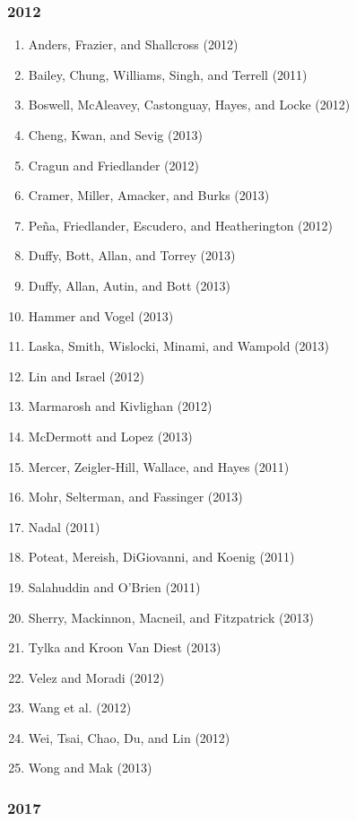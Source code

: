 \documentclass[english,man]{apa6}
\providecommand{\tightlist}{%
  \setlength{\itemsep}{0pt}\setlength{\parskip}{0pt}}
\begin{document}
\subsubsection{2012}\label{section-8}

\begin{enumerate}
\def\labelenumi{\arabic{enumi})}
\tightlist
\item
  Anders, Frazier, and Shallcross (2012)
\item
  Bailey, Chung, Williams, Singh, and Terrell (2011)
\item
  Boswell, McAleavey, Castonguay, Hayes, and Locke (2012)
\item
  Cheng, Kwan, and Sevig (2013)
\item
  Cragun and Friedlander (2012)
\item
  Cramer, Miller, Amacker, and Burks (2013)
\item
  Peña, Friedlander, Escudero, and Heatherington (2012)
\item
  Duffy, Bott, Allan, and Torrey (2013)
\item
  Duffy, Allan, Autin, and Bott (2013)
\item
  Hammer and Vogel (2013)
\item
  Laska, Smith, Wislocki, Minami, and Wampold (2013)
\item
  Lin and Israel (2012)
\item
  Marmarosh and Kivlighan (2012)
\item
  McDermott and Lopez (2013)
\item
  Mercer, Zeigler-Hill, Wallace, and Hayes (2011)
\item
  Mohr, Selterman, and Fassinger (2013)
\item
  Nadal (2011)
\item
  Poteat, Mereish, DiGiovanni, and Koenig (2011)
\item
  Salahuddin and O'Brien (2011)
\item
  Sherry, Mackinnon, Macneil, and Fitzpatrick (2013)
\item
  Tylka and Kroon Van Diest (2013)
\item
  Velez and Moradi (2012)
\item
  Wang et al. (2012)
\item
  Wei, Tsai, Chao, Du, and Lin (2012)
\item
  Wong and Mak (2013)
\end{enumerate}

\subsubsection{2017}\label{section-9}
\end{document}
